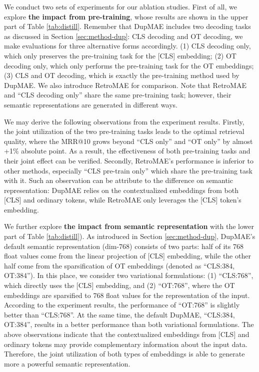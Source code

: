 \documentclass[11pt,a4paper]{article}
\begin{document}
We conduct two sets of experiments for our ablation studies. First of all, we explore \textbf{the impact from pre-training}, whose results are shown in the upper part of Table \ref{tab:distill}. Remember that DupMAE includes two decoding tasks as discussed in Section \ref{sec:method-dup}: CLS decoding and OT decoding, we make evaluations for three alternative forms accordingly. (1) CLS decoding only, which only preserves the pre-training task for the [CLS] embedding; (2) OT decoding only, which only performs the pre-training task for the OT embeddings; (3) CLS and OT decoding, which is exactly the pre-training method used by DupMAE. We also introduce RetroMAE for comparison. Note that RetroMAE and ``CLS decoding only'' share the same pre-training task; however, their semantic representations are generated in different ways. 

We may derive the following observations from the experiment results. Firstly, the joint utilization of the two pre-training tasks leads to the optimal retrieval quality, where the MRR@10 grows beyond ``CLS only'' and ``OT only'' by almost +1\% absolute point. As a result, the effectiveness of both pre-training tasks and their joint effect can be verified. Secondly, RetroMAE's performance is inferior to other methods, especially ``CLS pre-train only'' which share the pre-training task with it. Such an observation can be attribute to the difference on semantic representation: DupMAE relies on the contextualized embeddings from both [CLS] and ordinary tokens, while RetroMAE only leverages the [CLS] token's embedding. 

We further explore \textbf{the impact from semantic representation} with the lower part of Table \ref{tab:distill}). As introduced in Section \ref{sec:method-dup}, DupMAE's default semantic representation (dim-768) consists of two parts: half of its 768 float values come from the linear projection of [CLS] embedding, while the other half come from the sparsification of OT embeddings (denoted as ``CLS:384, OT:384''). In this place, we consider two variational formulations: (1) ``CLS:768'', which directly uses the [CLS] embedding, and (2) ``OT:768'', where the OT embeddings are sparsified to 768 float values for the representation of the input. According to the experiment results, the performance of ``OT:768'' is slightly better than ``CLS:768''. At the same time, the default DupMAE, ``CLS:384, OT:384'', results in a better performance than both variational formulations. The above observations indicate that the contextualized embeddings from [CLS] and ordinary tokens may provide complementary information about the input data. Therefore, the joint utilization of both types of embeddings is able to generate more a powerful semantic representation. 
\end{document}
